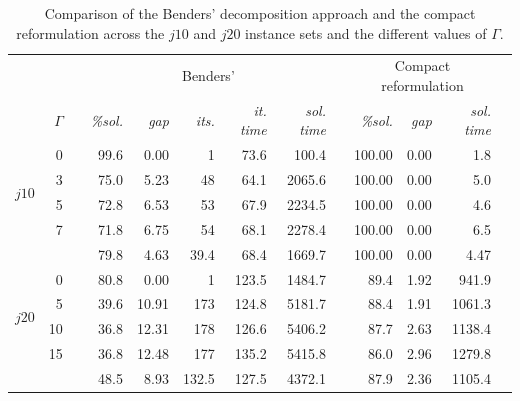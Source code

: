 \documentclass[a4paper,abstracton]{scrartcl}
\begin{document}
\begin{table}[h]
\centering
\small  %
{\renewcommand{\arraystretch}{1.2}  %
\begin{tabular}{lrrrrrrrrrrrr}
		     \hline \hline
		     &      & & \multicolumn{5}{c}{Benders'}                                       & & \multicolumn{3}{c}{Compact reformulation} \\
		     \cline{4-8} \cline{10-12}
		     & $\Gamma$ & & \textit{\%sol.} & \textit{gap} & \textit{its.} & \textit{it. time} & \textit{sol. time} & & \textit{\%sol.}   & \textit{gap}   & \textit{sol. time}   \\
		     \hline
	\multirow{4}{*}{$j10$} & 0    & & 99.6     & 0.00     & 1            & 73.6          & 100.4        & & 100.00     & 0.00       & 1.8             \\
			       & 3    & & 75.0     & 5.23     & 48           & 64.1          & 2065.6       & & 100.00     & 0.00       & 5.0             \\
			       & 5    & & 72.8     & 6.53     & 53           & 67.9          & 2234.5       & & 100.00     & 0.00       & 4.6             \\
			       & 7    & & 71.8     & 6.75     & 54           & 68.1          & 2278.4       & & 100.00     & 0.00       & 6.5             \\
		     \cline{4-8} \cline{10-12}
			       &      & & 79.8	   & 4.63     & 39.4	     & 68.4 	     & 1669.7	    & & 100.00     & 0.00	& 4.47 		  \\
		     \hline
	\multirow{4}{*}{$j20$} & 0    & & 80.8     & 0.00     & 1            & 123.5         & 1484.7       & & 89.4       & 1.92       & 941.9           \\
			       & 5    & & 39.6     & 10.91    & 173          & 124.8         & 5181.7       & & 88.4       & 1.91       & 1061.3          \\
			       & 10   & & 36.8     & 12.31    & 178          & 126.6         & 5406.2       & & 87.7       & 2.63       & 1138.4          \\
			       & 15   & & 36.8     & 12.48    & 177          & 135.2         & 5415.8       & & 86.0       & 2.96       & 1279.8          \\
		     \cline{4-8} \cline{10-12}
			       &      & & 48.5	   & 8.93     & 132.5	     & 127.5	     & 4372.1       & & 87.9       & 2.36       & 1105.4          \\
		     \hline \hline
\end{tabular}
}
\caption{Comparison of the Benders' decomposition approach and the compact reformulation across the $j10$ and $j20$ instance sets and the different values of $\Gamma$.}
\label{table:benders_vs_compact}
\end{table}
\end{document}

